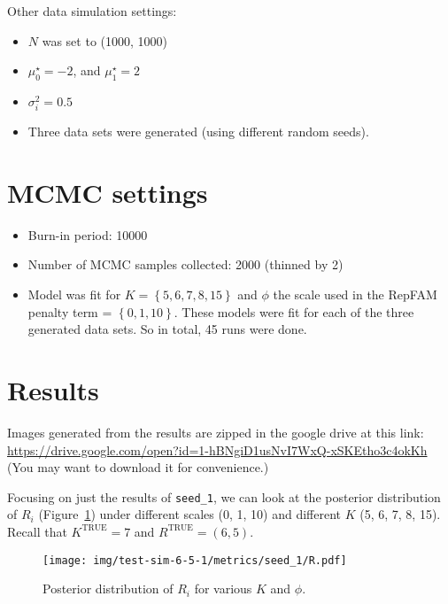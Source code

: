 \documentclass[12pt]{article} %
\newcommand{\bc}[1]{ \left\{#1\right\} }
\def\true{\text{TRUE}}
\begin{document}
Other data simulation settings:
\begin{itemize}
  \item $N$ was set to (1000, 1000)
  \item $\mu_0^\star = -2$, and $\mu_1^\star =2$
  \item $\sigma_i^2 = 0.5$
  \item Three data sets were generated (using different random seeds).
\end{itemize}


\section{MCMC settings}\label{sec:mcmc-settings}
\begin{itemize}
  \item Burn-in period: 10000
  \item Number of MCMC samples collected: 2000 (thinned by 2)
  \item Model was fit for $K=\bc{5, 6, 7, 8, 15}$ and $\phi$ the scale used in
    the RepFAM penalty term = $\bc{0, 1, 10}$. These models were fit for each of the
    three generated data sets. So in total, 45 runs were done.
\end{itemize}

\section{Results}\label{sec:results}
Images generated from the results are zipped in the google drive at this link: \\
\url{https://drive.google.com/open?id=1-hBNgiD1usNvI7WxQ-xSKEtho3c4okKh} \\

(You may want to download it for convenience.)

Focusing on just the results of \texttt{seed\_1}, we can look at the posterior
distribution of $R_i$ (Figure~\ref{fig:R-post}) under different scales (0, 1, 10) and
different $K$ (5, 6, 7, 8, 15). Recall that $K^\true=7$ and $R^\true = (6, 5)$.

\begin{figure}[h]
  \begin{center}
    \texttt{[image: img/test-sim-6-5-1/metrics/seed\_1/R.pdf]}
  \end{center}
  \label{fig:R-post}
  \caption{Posterior distribution of $R_i$ for various $K$ and $\phi$.}
\end{figure}
\end{document}
